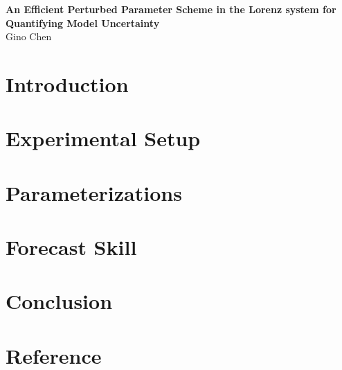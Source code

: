 \documentclass[9pt,twocolumn]{article}
\begin{document}
\newcommand{\citet}{\color{black}}  
\newcommand{\citep}{\color{black}}  

\begin{flushleft}
 {\bf{An Efficient Perturbed Parameter Scheme in the Lorenz system for Quantifying Model Uncertainty}} \\
 Gino Chen
\end{flushleft}

\section{Introduction}
	
\section{Experimental Setup}\label{sec:expsetup}
	
\section{Parameterizations}
	 \label{sec:schemesDet}
	\label{sec:schemesStoch}
	\label{sec:schemesPert}
\section{Forecast Skill}
	\label{sec:skills}
\section{Conclusion}
	
\section{Reference}
	


	
\end{document}
